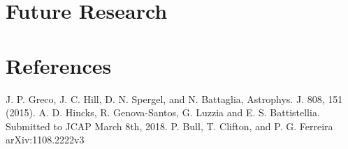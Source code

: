 \documentclass{princeton_astro_thesis}
\begin{document}
\chapter{Future Research}

\chapter{References}
J. P. Greco, J. C. Hill, D. N. Spergel, and N. Battaglia,
Astrophys. J. 808, 151 (2015). \newline
A. D. Hincks, R. Genova-Santos, G. Luzzia and
E. S. Battistellia. Submitted to JCAP March 8th, 2018. \newline
P. Bull, T. Clifton, and P. G. Ferreira arXiv:1108.2222v3 
\end{document}
